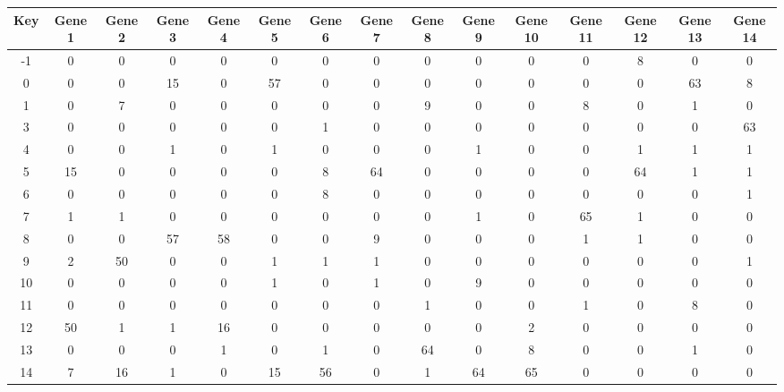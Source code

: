 \begin{tabular}{|c|c|c|c|c|c|c|c|c|c|c|c|c|c|c|}
\hline
Key & Gene 1 & Gene 2 & Gene 3 & Gene 4 & Gene 5 & Gene 6 & Gene 7 & Gene 8 & Gene 9 & Gene 10 & Gene 11 & Gene 12 & Gene 13 & Gene 14 \\
\hline
-1 & 0 & 0 & 0 & 0 & 0 & 0 & 0 & 0 & 0 & 0 & 0 & 8 & 0 & 0 \\
0 & 0 & 0 & 15 & 0 & 57 & 0 & 0 & 0 & 0 & 0 & 0 & 0 & 63 & 8 \\
1 & 0 & 7 & 0 & 0 & 0 & 0 & 0 & 9 & 0 & 0 & 8 & 0 & 1 & 0 \\
3 & 0 & 0 & 0 & 0 & 0 & 1 & 0 & 0 & 0 & 0 & 0 & 0 & 0 & 63 \\
4 & 0 & 0 & 1 & 0 & 1 & 0 & 0 & 0 & 1 & 0 & 0 & 1 & 1 & 1 \\
5 & 15 & 0 & 0 & 0 & 0 & 8 & 64 & 0 & 0 & 0 & 0 & 64 & 1 & 1 \\
6 & 0 & 0 & 0 & 0 & 0 & 8 & 0 & 0 & 0 & 0 & 0 & 0 & 0 & 1 \\
7 & 1 & 1 & 0 & 0 & 0 & 0 & 0 & 0 & 1 & 0 & 65 & 1 & 0 & 0 \\
8 & 0 & 0 & 57 & 58 & 0 & 0 & 9 & 0 & 0 & 0 & 1 & 1 & 0 & 0 \\
9 & 2 & 50 & 0 & 0 & 1 & 1 & 1 & 0 & 0 & 0 & 0 & 0 & 0 & 1 \\
10 & 0 & 0 & 0 & 0 & 1 & 0 & 1 & 0 & 9 & 0 & 0 & 0 & 0 & 0 \\
11 & 0 & 0 & 0 & 0 & 0 & 0 & 0 & 1 & 0 & 0 & 1 & 0 & 8 & 0 \\
12 & 50 & 1 & 1 & 16 & 0 & 0 & 0 & 0 & 0 & 2 & 0 & 0 & 0 & 0 \\
13 & 0 & 0 & 0 & 1 & 0 & 1 & 0 & 64 & 0 & 8 & 0 & 0 & 1 & 0 \\
14 & 7 & 16 & 1 & 0 & 15 & 56 & 0 & 1 & 64 & 65 & 0 & 0 & 0 & 0 \\
\hline
\end{tabular}